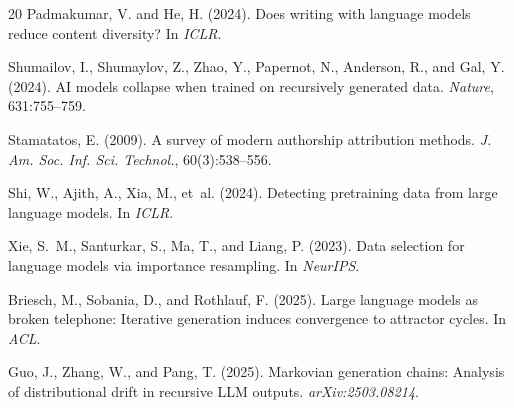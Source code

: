 \documentclass[11pt,a4paper]{article}
\begin{document}
\begin{thebibliography}{20}
Padmakumar, V. and He, H. (2024).
Does writing with language models reduce content diversity?
In \emph{ICLR}.

Shumailov, I., Shumaylov, Z., Zhao, Y., Papernot, N., Anderson, R., and Gal, Y. (2024).
AI models collapse when trained on recursively generated data.
\emph{Nature}, 631:755--759.

Stamatatos, E. (2009).
A survey of modern authorship attribution methods.
\emph{J. Am. Soc. Inf. Sci. Technol.}, 60(3):538--556.

Shi, W., Ajith, A., Xia, M., et~al. (2024).
Detecting pretraining data from large language models.
In \emph{ICLR}.

Xie, S.~M., Santurkar, S., Ma, T., and Liang, P. (2023).
Data selection for language models via importance resampling.
In \emph{NeurIPS}.

Briesch, M., Sobania, D., and Rothlauf, F. (2025).
Large language models as broken telephone: Iterative generation induces convergence to attractor cycles.
In \emph{ACL}.

Guo, J., Zhang, W., and Pang, T. (2025).
Markovian generation chains: Analysis of distributional drift in recursive LLM outputs.
\emph{arXiv:2503.08214}.

\end{thebibliography}
\end{document}
